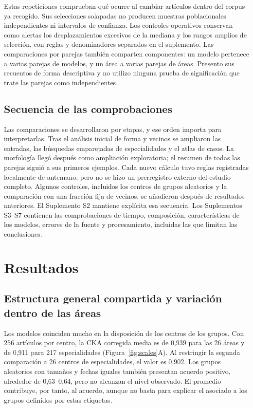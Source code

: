\documentclass[12pt]{article}
\begin{document}
Estas repeticiones comprueban qué ocurre al cambiar artículos dentro del corpus ya recogido. Sus selecciones solapadas no producen muestras poblacionales independientes ni intervalos de confianza. Los controles operativos conservan como alertas los desplazamientos excesivos de la mediana y los rangos amplios de selección, con reglas y denominadores separados en el suplemento. Las comparaciones por parejas también comparten componentes: un modelo pertenece a varias parejas de modelos, y un área a varias parejas de áreas. Presento sus recuentos de forma descriptiva y no utilizo ninguna prueba de significación que trate las parejas como independientes.

\subsection{Secuencia de las comprobaciones}
Las comparaciones se desarrollaron por etapas, y ese orden importa para interpretarlas. Tras el análisis inicial de forma y vecinos se ampliaron las entradas, las búsquedas emparejadas de especialidades y el atlas de casos. La morfología llegó después como ampliación exploratoria; el resumen de todas las parejas siguió a sus primeros ejemplos. Cada nuevo cálculo tuvo reglas registradas localmente de antemano, pero no se hizo un prerregistro externo del estudio completo. Algunos controles, incluidos los centros de grupos aleatorios y la comparación con una fracción fija de vecinos, se añadieron después de resultados anteriores. El Suplemento S2 mantiene explícita esa secuencia. Los Suplementos S3--S7 contienen las comprobaciones de tiempo, composición, características de los modelos, errores de la fuente y procesamiento, incluidas las que limitan las conclusiones.

\section{Resultados}
\subsection{Estructura general compartida y variación dentro de las áreas}
Los modelos coinciden mucho en la disposición de los centros de los grupos. Con 256 artículos por centro, la CKA corregida media es de 0,939 para las 26 áreas y de 0,911 para 217 especialidades (Figura~\ref{fig:scales}A). Al restringir la segunda comparación a 26 centros de especialidades, el valor es 0,902. Los grupos aleatorios con tamaños y fechas iguales también presentan acuerdo positivo, alrededor de 0,63--0,64, pero no alcanzan el nivel observado. El promedio contribuye, por tanto, al acuerdo, aunque no basta para explicar el asociado a los grupos definidos por estas etiquetas.
\end{document}
